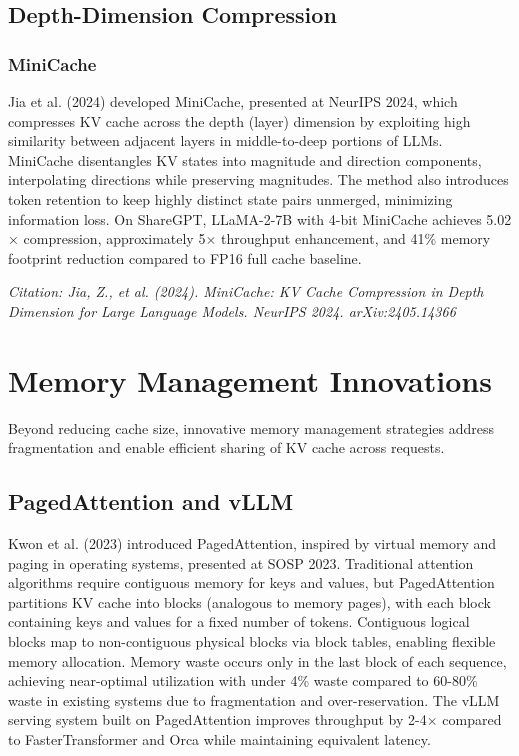 \documentclass[11pt,letterpaper]{article}
\begin{document}
\subsection{Depth-Dimension Compression}

\subsubsection{MiniCache}

Jia et al. (2024) developed MiniCache, presented at NeurIPS 2024, which compresses KV cache across the depth (layer) dimension by exploiting high similarity between adjacent layers in middle-to-deep portions of LLMs. MiniCache disentangles KV states into magnitude and direction components, interpolating directions while preserving magnitudes. The method also introduces token retention to keep highly distinct state pairs unmerged, minimizing information loss. On ShareGPT, LLaMA-2-7B with 4-bit MiniCache achieves 5.02$\times$ compression, approximately 5$\times$ throughput enhancement, and 41\% memory footprint reduction compared to FP16 full cache baseline.

\textit{Citation: Jia, Z., et al. (2024). MiniCache: KV Cache Compression in Depth Dimension for Large Language Models. NeurIPS 2024. arXiv:2405.14366}

\section{Memory Management Innovations}

Beyond reducing cache size, innovative memory management strategies address fragmentation and enable efficient sharing of KV cache across requests.

\subsection{PagedAttention and vLLM}

Kwon et al. (2023) introduced PagedAttention, inspired by virtual memory and paging in operating systems, presented at SOSP 2023. Traditional attention algorithms require contiguous memory for keys and values, but PagedAttention partitions KV cache into blocks (analogous to memory pages), with each block containing keys and values for a fixed number of tokens. Contiguous logical blocks map to non-contiguous physical blocks via block tables, enabling flexible memory allocation. Memory waste occurs only in the last block of each sequence, achieving near-optimal utilization with under 4\% waste compared to 60-80\% waste in existing systems due to fragmentation and over-reservation. The vLLM serving system built on PagedAttention improves throughput by 2-4$\times$ compared to FasterTransformer and Orca while maintaining equivalent latency.
\end{document}
